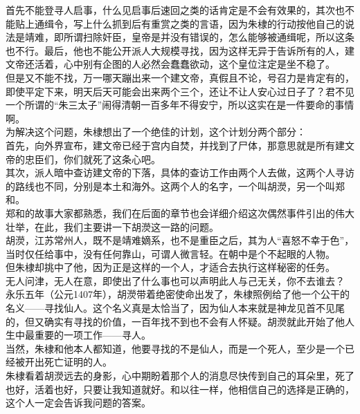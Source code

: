 \begin{multicols}{\theparacolNo}
首先不能登寻人启事，什么见启事后速回之类的话肯定是不会有效果的，其次也不能贴上通缉令，写上什么抓到后有重赏之类的言语，因为朱棣的行动按他自己的说法是靖难，即所谓扫除奸臣，皇帝是并没有错误的，怎么能够被通缉呢，所以这条也不行。最后，他也不能公开派人大规模寻找，因为这样无异于告诉所有的人，建文帝还活着，心中别有企图的人必然会蠢蠢欲动，这个皇位注定是坐不稳了。\\

但是又不能不找，万一哪天蹦出来一个建文帝，真假且不论，号召力是肯定有的，即使平定下来，明天后天可能会出来两个三个，还让不让人安心过日子了？君不见一个所谓的“朱三太子”闹得清朝一百多年不得安宁，所以这实在是一件要命的事情啊。\\

为解决这个问题，朱棣想出了一个绝佳的计划，这个计划分两个部分：\\

首先，向外界宣布，建文帝已经于宫内自焚，并找到了尸体，那意思就是所有建文帝的忠臣们，你们就死了这条心吧。\\

其次，派人暗中查访建文帝的下落，具体的查访工作由两个人去做，这两个人寻访的路线也不同，分别是本土和海外。这两个人的名字，一个叫胡濙，另一个叫郑和。\\

郑和的故事大家都熟悉，我们在后面的章节也会详细介绍这次偶然事件引出的伟大壮举，在此，我们主要讲一下胡濙这一路的问题。\\

胡濙，江苏常州人，既不是靖难嫡系，也不是重臣之后，其为人“喜怒不幸于色”，当时仅任给事中，没有任何靠山，可谓人微言轻。在朝中是个不起眼的人物。\\

但朱棣却挑中了他，因为正是这样的一个人，才适合去执行这样秘密的任务。\\

无人问津，无人在意，即使出了什么事也可以声明此人与己无关，你不去谁去？\\

永乐五年（公元1407年），胡濙带着绝密使命出发了，朱棣照例给了他一个公干的名义——寻找仙人。这个名义真是太恰当了，因为仙人本来就是神龙见首不见尾的，但又确实有寻找的价值，一百年找不到也不会有人怀疑。胡濙就此开始了他人生中最重要的一项工作——寻人。\\

当然，朱棣和他本人都知道，他要寻找的不是仙人，而是一个死人，至少是一个已经被开出死亡证明的人。\\

朱棣看着胡濙远去的身影，心中期盼着那个人的消息尽快传到自己的耳朵里，死了也好，活着也好，只要让我知道就好。和以往一样，他相信自己的选择是正确的，这个人一定会告诉我问题的答案。\\


\end{multicols}
